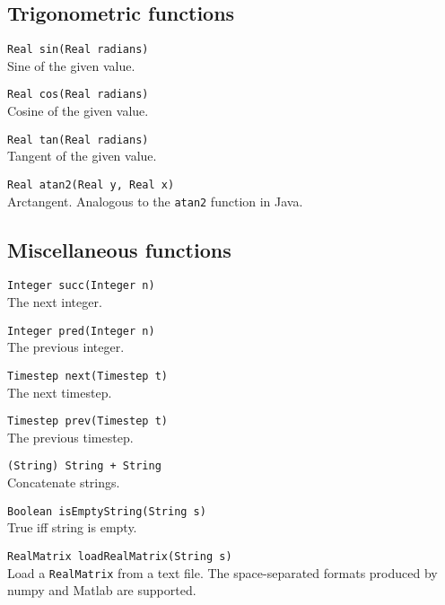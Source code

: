 \subsection{Trigonometric functions}
\label{sec:builtin-trig}

\verb|Real sin(Real radians)| \\
Sine of the given value.

\verb|Real cos(Real radians)| \\
Cosine of the given value.

\verb|Real tan(Real radians)| \\
Tangent of the given value.

\verb|Real atan2(Real y, Real x)| \\
Arctangent. Analogous to the \verb|atan2| function in Java.


\subsection{Miscellaneous functions}
\label{sec:builtin-misc}

\verb|Integer succ(Integer n)| \\
The next integer.

\verb|Integer pred(Integer n)| \\
The previous integer.

\verb|Timestep next(Timestep t)| \\
The next timestep.

\verb|Timestep prev(Timestep t)| \\
The previous timestep.

\verb|(String) String + String| \\
Concatenate strings.

\verb|Boolean isEmptyString(String s)| \\
True iff string is empty.

\verb|RealMatrix loadRealMatrix(String s)| \\
Load a \verb|RealMatrix| from a text file. The space-separated formats produced
by numpy and Matlab are supported.
